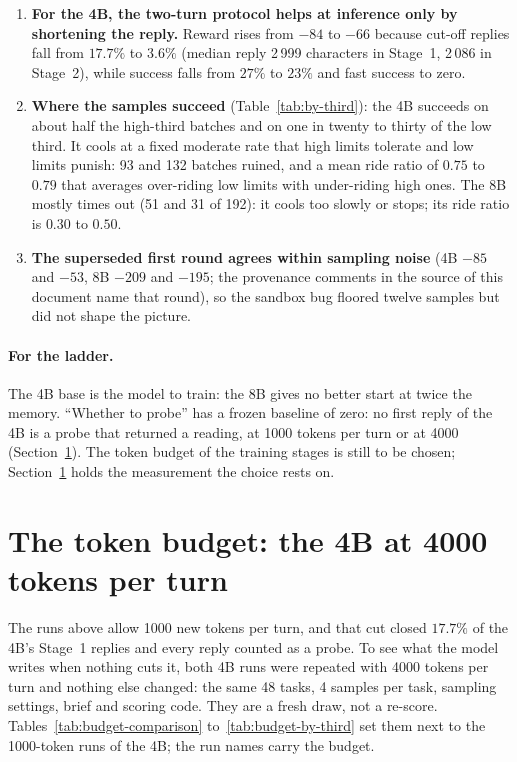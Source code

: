 \documentclass[11pt,a4paper]{article}
\begin{document}
\begin{enumerate}[leftmargin=1.5em]
  \item \textbf{For the 4B, the two-turn protocol helps at inference only by
  shortening the reply.} Reward rises from $-84$ to $-66$ because cut-off
  replies fall from $17.7\%$ to $3.6\%$ (median reply 2\,999 characters in
  Stage~1, 2\,086 in Stage~2), while success falls from
  $27\%$ to $23\%$ and fast success to zero.

  \item \textbf{Where the samples succeed} (Table~\ref{tab:by-third}): the
  4B succeeds on about half the high-third batches and on one in twenty to
  thirty of the low third. It cools at a fixed moderate rate that high limits
  tolerate and low limits punish: 93 and 132 batches ruined, and a mean ride
  ratio of $0.75$ to $0.79$ that averages over-riding low limits with
  under-riding high ones. The 8B mostly times out (51 and 31 of 192): it
  cools too slowly or stops; its ride ratio is $0.30$ to $0.50$.

  \item \textbf{The superseded first round agrees within sampling noise}
  (4B $-85$ and $-53$, 8B $-209$ and $-195$; the provenance comments in the
  source of this document name that round), so the sandbox bug floored
  twelve samples but did not shape the picture.
\end{enumerate}

\paragraph{For the ladder.} The 4B base is the model to train: the 8B
gives no better start at twice the memory. ``Whether to probe'' has a frozen
baseline of zero: no first reply of the 4B is a probe that returned a
reading, at 1000 tokens per turn or at 4000 (Section~\ref{sec:budget}). The
token budget of the training stages is still to be chosen;
Section~\ref{sec:budget} holds the measurement the choice rests on.


\section{The token budget: the 4B at 4000 tokens per turn}
\label{sec:budget}

The runs above allow 1000 new tokens per turn, and that cut closed $17.7\%$
of the 4B's Stage~1 replies and every reply counted as a probe. To see what
the model writes when nothing cuts it, both 4B runs were repeated with 4000
tokens per turn and nothing else changed: the same 48 tasks, 4 samples per
task, sampling settings, brief and scoring code. They are a fresh draw, not a
re-score. Tables~\ref{tab:budget-comparison} to~\ref{tab:budget-by-third} set
them next to the 1000-token runs of the 4B; the run names carry the budget.
\end{document}
